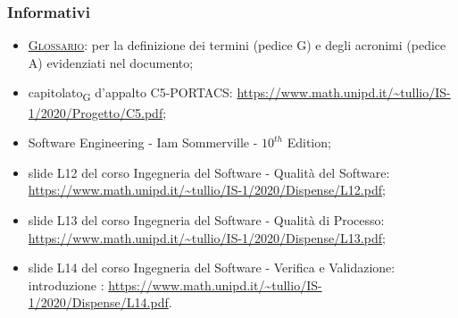     \subsubsection{Informativi}
    \begin{itemize}
        \item \textsc{\href{https://github.com/Three-Way-Milkshake/docs/wiki/Glossario}{Glossario}}: per la definizione dei termini (pedice G) e degli acronimi (pedice A) evidenziati nel documento;
    	\item capitolato\textsubscript{G} d'appalto C5-PORTACS: \newline
    	\url{https://www.math.unipd.it/~tullio/IS-1/2020/Progetto/C5.pdf};
       	\item Software Engineering - Iam Sommerville - $10^{th}$ Edition;
        \item slide L12 del corso Ingegneria del Software - Qualità del Software:\newline
        \url{https://www.math.unipd.it/~tullio/IS-1/2020/Dispense/L12.pdf};
        \item slide L13 del corso Ingegneria del Software - Qualità di Processo:\newline
        \url{https://www.math.unipd.it/~tullio/IS-1/2020/Dispense/L13.pdf};
        \item slide L14 del corso Ingegneria del Software - Verifica e Validazione: introduzione :\newline
        \url{https://www.math.unipd.it/~tullio/IS-1/2020/Dispense/L14.pdf}.
    \end{itemize}